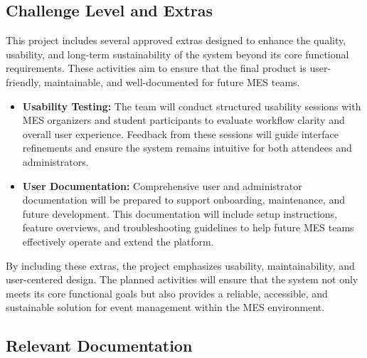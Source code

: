 \documentclass[12pt, titlepage]{article}
\begin{document}
\subsection{Challenge Level and Extras}

This project includes several approved extras designed to enhance the quality, usability, and long-term sustainability of the system beyond its core functional requirements. These activities aim to ensure that the final product is user-friendly, maintainable, and well-documented for future MES teams.

\begin{itemize}
    \item \textbf{Usability Testing:} The team will conduct structured usability sessions with MES organizers and student participants to evaluate workflow clarity and overall user experience. Feedback from these sessions will guide interface refinements and ensure the system remains intuitive for both attendees and administrators.
    \item \textbf{User Documentation:} Comprehensive user and administrator documentation will be prepared to support onboarding, maintenance, and future development. This documentation will include setup instructions, feature overviews, and troubleshooting guidelines to help future MES teams effectively operate and extend the platform.
\end{itemize}

By including these extras, the project emphasizes usability, maintainability, and user-centered design. The planned activities will ensure that the system not only meets its core functional goals but also provides a reliable, accessible, and sustainable solution for event management within the MES environment.
\subsection{Relevant Documentation}
\end{document}
